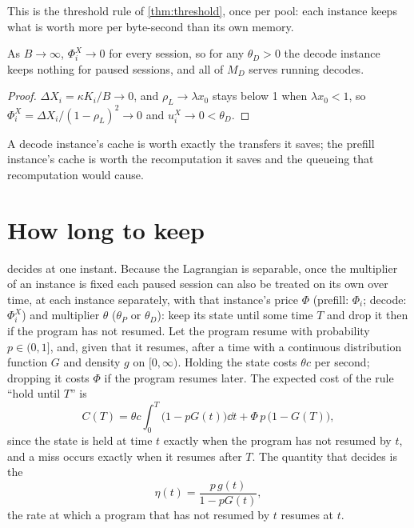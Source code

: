 This is the threshold rule of \cref{thm:threshold}, once per pool: each instance keeps
what is worth more per byte-second than its own memory.

\begin{corollary}\label{L5:cor:free-transfer}
As $B\to\infty$, $\Phi^X_i\to0$ for every session, so for any $\theta_D>0$ the decode
instance keeps nothing for paused sessions, and all of $M_D$ serves running decodes.
\end{corollary}

\begin{proof}
$\Delta X_i=\kappa K_i/B\to0$, and $\rho_L\to\lambda x_0$ stays below 1 when $\lambda x_0<1$,
so $\Phi^X_i=\Delta X_i/(1-\rho_L)^2\to0$ and $u^X_i\to0<\theta_D$.
\end{proof}

A decode instance's cache is worth exactly the transfers it saves; the prefill
instance's cache is worth the recomputation it saves and the queueing that recomputation
would cause.

\section{How long to keep}\label{L5:sec:hold}

 decides at one instant. Because the Lagrangian is separable, once
the multiplier of an instance is fixed each paused session can also be treated on its own
over time, at each instance separately, with that instance's price $\Phi$ (prefill:
$\Phi_i$; decode: $\Phi^X_i$) and multiplier $\theta$ ($\theta_P$ or $\theta_D$): keep its state until some time $T$ and drop it then if the
program has not resumed. Let the program resume with probability $p\in(0,1]$, and, given
that it resumes, after a time with a continuous distribution function $G$ and density
$g$ on $[0,\infty)$. Holding the state costs $\theta c$ per second; dropping it costs
$\Phi$ if the program resumes later. The expected cost of the rule ``hold until $T$'' is
\begin{equation}\label{L5:eq:hold-cost}
  C(T)=\theta c\int_0^T\bigl(1-pG(t)\bigr)\dd t+\Phi\,p\,\bigl(1-G(T)\bigr),
\end{equation}
since the state is held at time $t$ exactly when the program has not resumed by $t$,
and a miss occurs exactly when it resumes after $T$. The quantity that decides is the
\[
  \eta(t)=\frac{p\,g(t)}{1-pG(t)},
\]
the rate at which a program that has not resumed by $t$ resumes at $t$.

